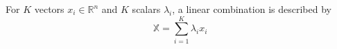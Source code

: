 For $K$ vectors $x_i \in \mathbb{R}^n$ and $K$ scalars $\lambda_i$, a linear combination is described by $$\mathbb{X} = \sum\limits_{i=1}^{K} \lambda_i x_i$$
